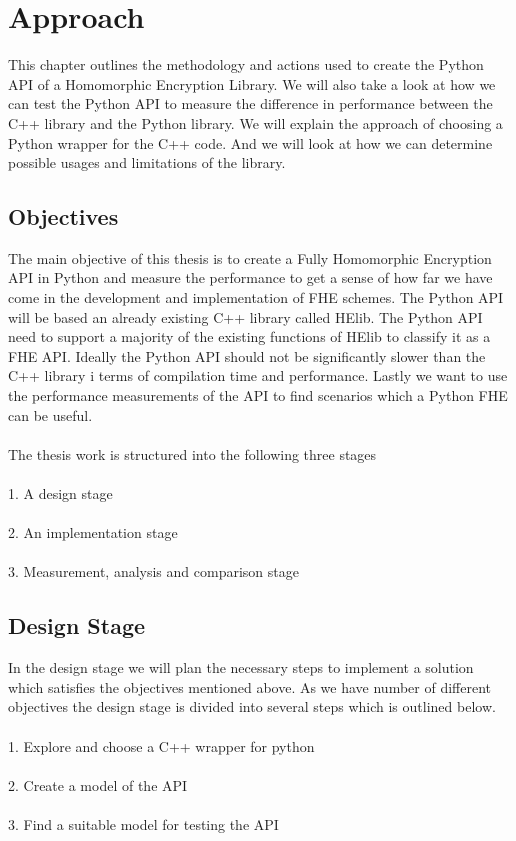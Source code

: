 \chapter{Approach}

This chapter outlines the methodology and actions used to create the Python API of a Homomorphic Encryption Library. We will also take a look at how we can test the Python API to measure the difference in performance between the C++ library and the Python library. We will explain the approach of choosing a Python wrapper for the C++ code. And we will look at how we can determine possible usages and limitations of the library.





\section{Objectives}

The main objective of this thesis is to create a Fully Homomorphic Encryption API in Python and measure the performance to get a sense of how far we have come in the development and implementation of FHE schemes. The Python API will be based an already existing C++ library called HElib. The Python API need to support a majority of the existing functions of HElib  to classify it as a FHE API. Ideally the Python API should not be significantly slower than the C++ library i terms of compilation time and performance. Lastly we want to use the performance measurements of the API to find scenarios which a Python FHE can be useful.
\\\\
The thesis work is structured into the following three stages
\\\\
1. A design stage\\\\
2. An implementation stage\\\\
3. Measurement, analysis and comparison stage

\section{Design Stage}

In the design stage we will plan the necessary steps to implement a solution which satisfies the objectives mentioned above. As we have number of different objectives the design stage is divided into several steps which is outlined below.
\\\\
1. Explore and choose a C++ wrapper for python\\\\
2. Create a model of the API\\\\
3. Find a suitable model for testing the API


